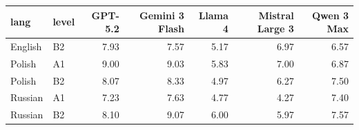 \begin{tabular}{llrrrrr}
\toprule
lang & level & GPT-5.2 & Gemini 3 Flash & Llama 4 & Mistral Large 3 & Qwen 3 Max \\
\midrule
English & B2 & 7.93 & 7.57 & 5.17 & 6.97 & 6.57 \\
Polish & A1 & 9.00 & 9.03 & 5.83 & 7.00 & 6.87 \\
Polish & B2 & 8.07 & 8.33 & 4.97 & 6.27 & 7.50 \\
Russian & A1 & 7.23 & 7.63 & 4.77 & 4.27 & 7.40 \\
Russian & B2 & 8.10 & 9.07 & 6.00 & 5.97 & 7.57 \\
\bottomrule
\end{tabular}
